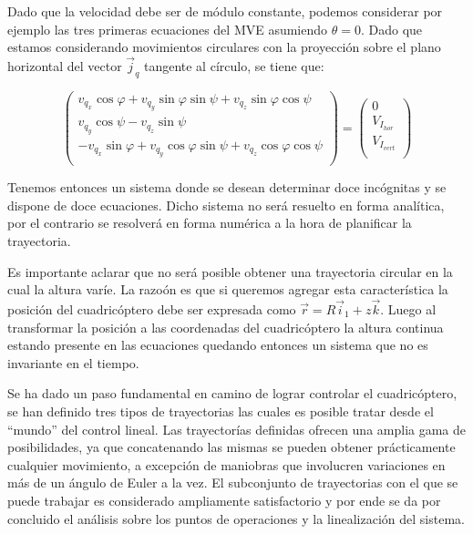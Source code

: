 \documentclass[main]{subfiles}
\begin{document}
Dado que la velocidad debe ser de m\'odulo constante, podemos considerar por ejemplo las tres primeras ecuaciones del MVE asumiendo $\theta=0$. Dado que estamos considerando movimientos circulares con la proyecci\'on sobre el plano horizontal del vector $\vec{j}_q$ tangente al c\'irculo, se tiene que:

\begin{equation}
\left(\begin{array}{c}
v_{q_x}\cos\varphi+v_{q_y}\sin\varphi\sin\psi+v_{q_z}\sin\varphi\cos\psi\\
v_{q_y}\cos\psi-v_{q_z}\sin\psi\\
-v_{q_x}\sin\varphi+v_{q_y}\cos\varphi\sin\psi+v_{q_z}\cos\varphi\cos\psi\\
\end{array}\right)=\left(\begin{array}{c}
0\\
V_{I_{hor}}\\
V_{I_{vert}}\\
\end{array}\right)
\end{equation}

Tenemos entonces un sistema donde se desean determinar doce inc\'ognitas y se dispone de doce ecuaciones. Dicho sistema no ser\'a resuelto en forma anal\'itica, por el contrario se resolver\'a en forma num\'erica a la hora de planificar la trayectoria. 

Es importante aclarar que no ser\'a posible obtener una trayectoria circular en la cual la altura var\'ie. La razo\'on es que si queremos agregar esta caracter\'istica la posici\'on del cuadric\'optero debe ser expresada como $\vec{r}=R\vec{i}_1+z\vec{k}$. Luego al transformar la posici\'on a las coordenadas del cuadric\'optero la altura continua estando presente en las ecuaciones quedando entonces un sistema que no es invariante en el tiempo. 

Se ha dado un paso fundamental en camino de lograr controlar el cuadric\'optero, se han definido tres tipos de trayectorias las cuales es posible tratar desde el ``mundo'' del control lineal. Las trayector\'ias definidas ofrecen una amplia gama de posibilidades, ya que concatenando las mismas se pueden obtener pr\'acticamente cualquier movimiento, a excepci\'on de maniobras que involucren variaciones en m\'as de un \'angulo de Euler a la vez. El subconjunto de trayectorias con el que se puede trabajar es considerado ampliamente satisfactorio y por ende se da por concluido el an\'alisis sobre los puntos de operaciones y la linealizaci\'on del sistema. 
\end{document}
